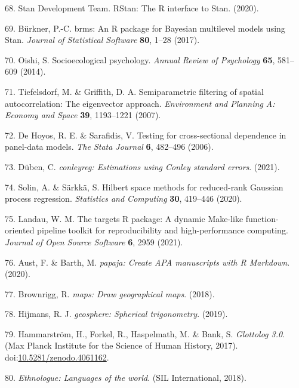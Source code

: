 \documentclass[english,man,floatsintext]{apa6}
\begin{document}
\leavevmode\hypertarget{ref-rstan}{}%
68. Stan Development Team. RStan: The R interface to Stan. (2020).

\leavevmode\hypertarget{ref-Burkner2017}{}%
69. Bürkner, P.-C. brms: An R package for Bayesian multilevel models using Stan. \emph{Journal of Statistical Software} \textbf{80}, 1--28 (2017).

\leavevmode\hypertarget{ref-Oishi2013}{}%
70. Oishi, S. Socioecological psychology. \emph{Annual Review of Psychology} \textbf{65}, 581--609 (2014).

\leavevmode\hypertarget{ref-Tiefelsdorf2007}{}%
71. Tiefelsdorf, M. \& Griffith, D. A. Semiparametric filtering of spatial autocorrelation: The eigenvector approach. \emph{Environment and Planning A: Economy and Space} \textbf{39}, 1193--1221 (2007).

\leavevmode\hypertarget{ref-DeHoyos2006}{}%
72. De Hoyos, R. E. \& Sarafidis, V. Testing for cross-sectional dependence in panel-data models. \emph{The Stata Journal} \textbf{6}, 482--496 (2006).

\leavevmode\hypertarget{ref-Duben2021}{}%
73. Düben, C. \emph{conleyreg: Estimations using Conley standard errors}. (2021).

\leavevmode\hypertarget{ref-Solin2020}{}%
74. Solin, A. \& Särkkä, S. Hilbert space methods for reduced-rank Gaussian process regression. \emph{Statistics and Computing} \textbf{30}, 419--446 (2020).

\leavevmode\hypertarget{ref-Landau2021}{}%
75. Landau, W. M. The targets R package: A dynamic Make-like function-oriented pipeline toolkit for reproducibility and high-performance computing. \emph{Journal of Open Source Software} \textbf{6}, 2959 (2021).

\leavevmode\hypertarget{ref-Aust2020}{}%
76. Aust, F. \& Barth, M. \emph{papaja: Create APA manuscripts with R Markdown}. (2020).

\leavevmode\hypertarget{ref-Brownrigg2018}{}%
77. Brownrigg, R. \emph{maps: Draw geographical maps}. (2018).

\leavevmode\hypertarget{ref-Hijmans2019}{}%
78. Hijmans, R. J. \emph{geosphere: Spherical trigonometry}. (2019).

\leavevmode\hypertarget{ref-Glottolog}{}%
79. Hammarström, H., Forkel, R., Haspelmath, M. \& Bank, S. \emph{Glottolog 3.0}. (Max Planck Institute for the Science of Human History, 2017). doi:\href{https://doi.org/10.5281/zenodo.4061162}{10.5281/zenodo.4061162}.

\leavevmode\hypertarget{ref-Ethnologue}{}%
80. \emph{Ethnologue: Languages of the world}. (SIL International, 2018).
\end{document}
